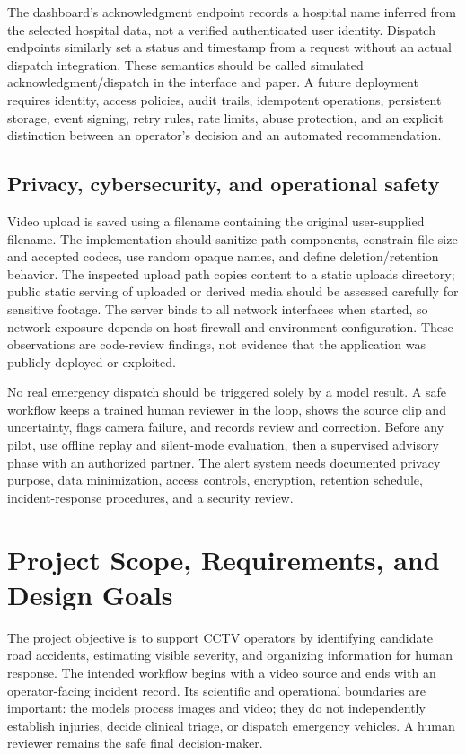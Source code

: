 \documentclass[12pt,a4paper]{article}
\begin{document}
The dashboard's acknowledgment endpoint records a hospital name inferred from the selected hospital data, not a verified authenticated user identity. Dispatch endpoints similarly set a status and timestamp from a request without an actual dispatch integration. These semantics should be called simulated acknowledgment/dispatch in the interface and paper. A future deployment requires identity, access policies, audit trails, idempotent operations, persistent storage, event signing, retry rules, rate limits, abuse protection, and an explicit distinction between an operator's decision and an automated recommendation.

\subsection{Privacy, cybersecurity, and operational safety}
Video upload is saved using a filename containing the original user-supplied filename. The implementation should sanitize path components, constrain file size and accepted codecs, use random opaque names, and define deletion/retention behavior. The inspected upload path copies content to a static uploads directory; public static serving of uploaded or derived media should be assessed carefully for sensitive footage. The server binds to all network interfaces when started, so network exposure depends on host firewall and environment configuration. These observations are code-review findings, not evidence that the application was publicly deployed or exploited.

No real emergency dispatch should be triggered solely by a model result. A safe workflow keeps a trained human reviewer in the loop, shows the source clip and uncertainty, flags camera failure, and records review and correction. Before any pilot, use offline replay and silent-mode evaluation, then a supervised advisory phase with an authorized partner. The alert system needs documented privacy purpose, data minimization, access controls, encryption, retention schedule, incident-response procedures, and a security review.

\section{Project Scope, Requirements, and Design Goals}
The project objective is to support CCTV operators by identifying candidate road accidents, estimating visible severity, and organizing information for human response. The intended workflow begins with a video source and ends with an operator-facing incident record. Its scientific and operational boundaries are important: the models process images and video; they do not independently establish injuries, decide clinical triage, or dispatch emergency vehicles. A human reviewer remains the safe final decision-maker.
\end{document}
